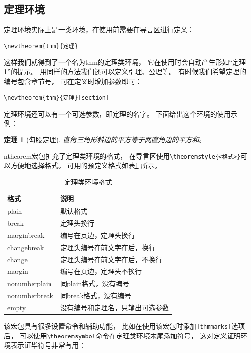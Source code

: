 \documentclass{ctexart}
\numberwithin{equation}{section}			%
\newtheorem{thm}{定理}[section]
{	%
	\theoremstyle{nonumberplain}
	\theoremheaderfont{\bfseries}
	\theorembodyfont{\normalfont}
	\theoremsymbol{\ensuremath{\Box}}
	\newtheorem{proof}{证明}
}
\begin{document}
	\subsection{定理环境}
	定理环境实际上是一类环境，在使用前需要在导言区进行定义：

\begin{lstlisting}
\newtheorem{thm}{定理}
\end{lstlisting}
	
	这样我们就得到了一个名为thm的定理类环境，
	它在使用时会自动产生形如“定理1”的提示。
	用同样的方法我们还可以定义引理、公理等。
	有时候我们希望定理的编号包含章节号，
	可在定义时增加参数即可：

\begin{lstlisting}
\newtheorem{thm}{定理}[section]
\end{lstlisting}
	
	定理环境还可以有一个可选参数，即定理的名字。
	下面给出这个环境的使用示例：
	
	\begin{thm}[勾股定理]
		直角三角形斜边的平方等于两直角边的平方和。
	\end{thm}	

	ntheorem宏包扩充了定理类环境的格式，
	在导言区使用\verb|\theoremstyle{<格式>}|可以方便地选择格式。
	可用的预定义格式如表\ref{tab:thmstyle} 所示。
	
	\begin{table}
		\centering
		\caption{定理类环境格式}
		\label{tab:thmstyle}
		\begin{tabular}{ll}
			\toprule
			格式 & 说明 \\
			\midrule
			plain & 默认格式 \\
			break & 定理头换行 \\
			marginbreak & 编号在页边，定理头换行 \\
			changebreak & 定理头编号在前文字在后，换行 \\
			change & 定理头编号在前文字在后，不换行 \\
			margin & 编号在页边，定理头不换行 \\
			nonumberplain & 同plain格式，没有编号 \\
			nonumberbreak & 同break格式，没有编号 \\
			empty & 没有编号和定理名，只输出可选参数 \\
			\bottomrule
		\end{tabular}
	\end{table}
	
	该宏包具有很多设置命令和辅助功能，
	比如在使用该宏包时添加\verb|[thmmarks]|选项后，
	可以使用\verb|\theoremsymbol|命令在定理类环境末尾添加符号，
	这对定义证明环境表示证毕符号非常有用：
	
\end{document}
